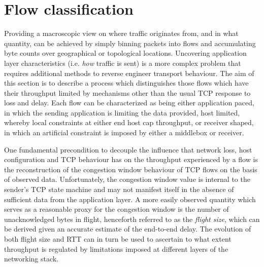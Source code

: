 \section{Flow classification}
\label{section:rate:flow}

Providing a macroscopic view on where traffic originates from, and in what quantity, can be achieved by simply binning packets into flows and accumulating byte counts over geographical or topological locations. 
Uncovering application layer characteristics (i.e. \textit{how} traffic is sent) is a more complex problem that requires additional methods to reverse engineer transport behaviour.
The aim of this section is to describe a process which distinguishes those flows which have their throughput limited by mechanisms other than the usual \ac{TCP} response to loss and delay.
Each flow can be characterized as being either application paced, in which the sending application is limiting the data provided, host limited, whereby local constraints at either end host cap throughput, or receiver shaped, in which an artificial constraint is imposed by either a middlebox or receiver.

One fundamental precondition to decouple the influence that network loss, host configuration and \ac{TCP} behaviour has on the throughput experienced by a flow is the reconstruction of the congestion window behaviour of \ac{TCP} flows on the basis of observed data. 
Unfortunately, the congestion window value is internal to the sender's \ac{TCP} state machine and may not manifest itself in the absence of sufficient data from the application layer. 
A more easily observed quantity which serves as a reasonable proxy for the congestion window is the number of unacknowledged bytes in flight, henceforth referred to as the \textit{flight size}, which can be derived given an accurate estimate of the end-to-end delay.
The evolution of both flight size and \ac{RTT} can in turn be used to ascertain to what extent throughput is regulated by limitations imposed at different layers of the networking stack.

